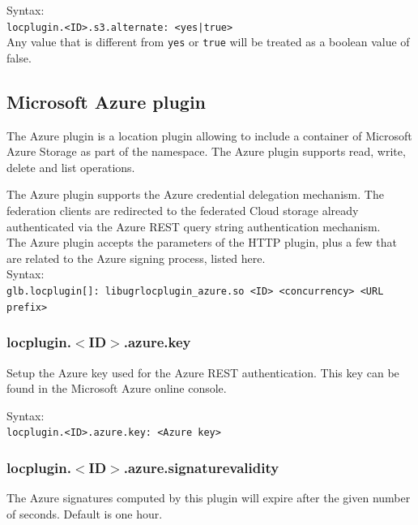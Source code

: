 \documentclass[12pt]{article} %
\begin{document}
Syntax:\\
\lstinline"locplugin.<ID>.s3.alternate: <yes|true>"\\
Any value that is different from \lstinline"yes" or \lstinline"true" will be treated as a boolean value of false.\\
















\subsection{Microsoft Azure plugin}
The Azure plugin is a location plugin allowing to include a container of Microsoft Azure Storage as part of the namespace. The Azure plugin supports read, write, delete and list operations.

The Azure plugin supports the Azure credential delegation mechanism. The federation clients are redirected to the federated Cloud storage already authenticated via the Azure REST query string authentication mechanism.\\
The Azure plugin accepts the parameters of the HTTP plugin, plus a few that are related to the Azure signing process, listed here.\\

Syntax:\\
\lstinline"glb.locplugin[]: libugrlocplugin_azure.so <ID> <concurrency> <URL prefix>"\\

\subsubsection{locplugin.$<$ID$>$.azure.key}
Setup the Azure key used for the Azure REST authentication. This key can be found in the Microsoft Azure online console.

Syntax:\\
\lstinline"locplugin.<ID>.azure.key: <Azure key>"\\


\subsubsection{locplugin.$<$ID$>$.azure.signaturevalidity}
The Azure signatures computed by this plugin will expire after the given number of seconds. Default is one hour.\\
\end{document}
